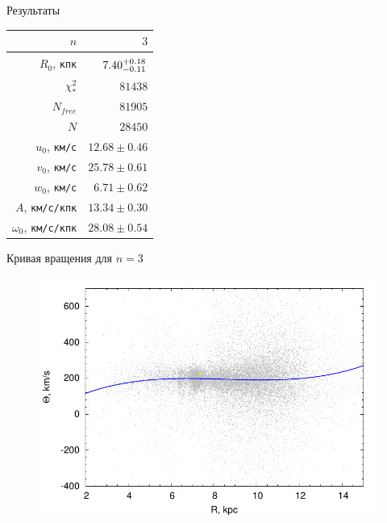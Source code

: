 \documentclass{beamer}
\begin{document}
\begin{frame}{Результаты}
	\begin{table}[ht]
	\centering
\begin{tabular}{r|r}
  \hline
  $n$& $3$\\
  \hline
  $R_0$, \texttt{кпк} & $7.40^{+0.18^{\vphantom{T^T}}}_{-0.11} $ \\
  \hline
  $\chi^2_*$& $81438$ \\
  \hline
  $N_{free}$& $81905$ \\
  \hline
  $N$& $28450$ \\
  \hline
  $u_0$, \texttt{км/с}  & $12.68 \pm 0.46 $ \\
  $v_0$, \texttt{км/с} & $25.78 \pm 0.61$ \\
  $w_0$, \texttt{км/с}  & $6.71 \pm 0.62$ \\
  \hline
  $A$, \texttt{км/с/кпк} & $ 13.34 \pm 0.30 $ \\
  \hline
  $\omega_{0}$, \texttt{км/с/кпк} & $ 28.08 \pm 0.54 $ \\
  \hline
\end{tabular}
\end{table}
\end{frame}

\begin{frame}{Кривая вращения для $n = 3$}
\begin{figure}[h]
\begin{minipage}[h]{0.8\linewidth}
	\includegraphics[width=1\linewidth]{pdf/rotc.pdf}
\end{minipage}
\end{figure}
\end{frame}
\end{document}
